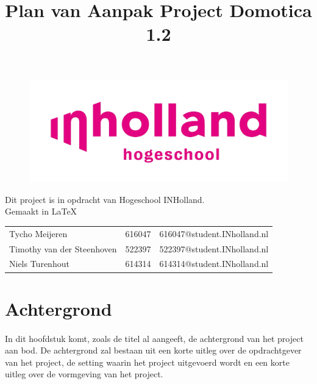 \documentclass[11pt]{article}
\title{Plan van Aanpak Project Domotica 1.2}
\date{} %
\begin{document}
\thispagestyle{empty}
\maketitle %

\begin{figure}[h]
	\centering
	\includegraphics[width=\textwidth]{inholland}
\end{figure}

\vspace{20mm} %

\centering Dit project is in opdracht van Hogeschool INHolland.\\ Gemaakt in \LaTeX 

	\vspace{10mm}

\begin{tabular} {l c c} %
	
	Tycho Meijeren & 616047& 616047@student.INholland.nl\\
	
	Timothy van der Steenhoven & 522397 & 522397@student.INholland.nl\\
	
	Niels Turenhout & 614314 & 614314@student.INholland.nl
\end{tabular}


\newpage

\tableofcontents
\thispagestyle{empty}

\newpage
\section{Achtergrond}

\paragraph{}
\begin{flushleft}
In dit hoofdstuk komt, zoals de titel al aangeeft, de achtergrond van het project aan bod.
De achtergrond zal bestaan uit een korte uitleg over de opdrachtgever van het project, de 
setting waarin het project uitgevoerd wordt en een korte uitleg over de vormgeving van het project.
\end{flushleft}
\end{document}

